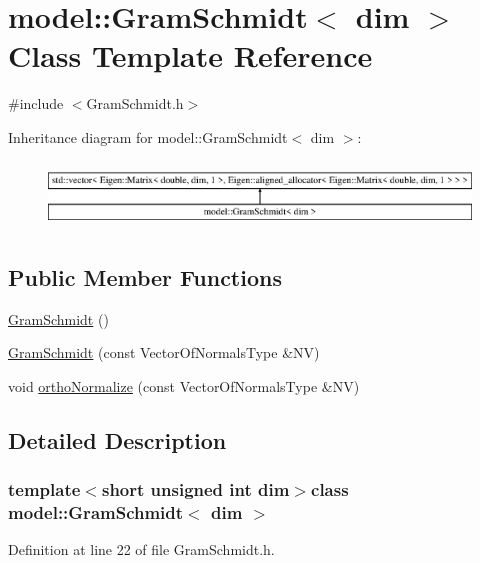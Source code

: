 \hypertarget{classmodel_1_1_gram_schmidt}{}\section{model\+:\+:Gram\+Schmidt$<$ dim $>$ Class Template Reference}
\label{classmodel_1_1_gram_schmidt}


{\ttfamily \#include $<$Gram\+Schmidt.\+h$>$}

Inheritance diagram for model\+:\+:Gram\+Schmidt$<$ dim $>$\+:\begin{figure}[H]
\begin{center}
\leavevmode
\includegraphics[height=1.783440cm]{classmodel_1_1_gram_schmidt}
\end{center}
\end{figure}
\subsection*{Public Member Functions}
\begin{DoxyCompactItemize}
\item 
\hyperlink{classmodel_1_1_gram_schmidt_a8faab3a16e2a7d3efd74941605b81743}{Gram\+Schmidt} ()
\item 
\hyperlink{classmodel_1_1_gram_schmidt_a1e41482b1254200d38cd4b26f1a45fa4}{Gram\+Schmidt} (const Vector\+Of\+Normals\+Type \&N\+V)
\item 
void \hyperlink{classmodel_1_1_gram_schmidt_a27d618bf066cce10afdcd9758daa4260}{ortho\+Normalize} (const Vector\+Of\+Normals\+Type \&N\+V)
\end{DoxyCompactItemize}


\subsection{Detailed Description}
\subsubsection*{template$<$short unsigned int dim$>$class model\+::\+Gram\+Schmidt$<$ dim $>$}



Definition at line 22 of file Gram\+Schmidt.\+h.



